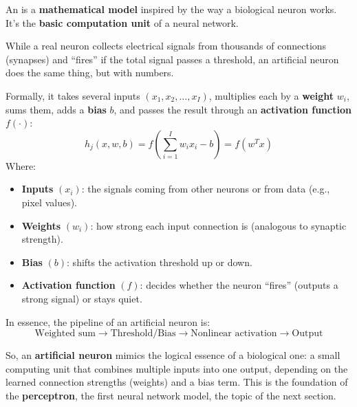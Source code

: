 \newpage

\begin{definitionbox}\label{def:artificial-neuron}
    An  is a \textbf{mathematical model} inspired by the way a biological neuron works. It's the \textbf{basic computation unit} of a neural network.

    \highspace
    While a real neuron collects electrical signals from thousands of connections (synapses) and ``fires'' if the total signal passes a threshold, an artificial neuron does the same thing, but with numbers.

    \highspace
    Formally, it takes several inputs $\left(x_1, x_2, \ldots, x_I\right)$, multiplies each by a \textbf{weight} $w_i$, sums them, adds a \textbf{bias} $b$, and passes the result through an \textbf{activation function} $f(\cdot)$:
    \begin{equation}
        h_{j}\left(x, w, b\right) = f\left(\sum_{i=1}^{I} w_{i} x_{i} - b\right) = f\left(w^{T} x\right)
    \end{equation}
    Where:
    \begin{itemize}
        \item \textbf{Inputs} $\left(x_i\right)$: the signals coming from other neurons or from data (e.g., pixel values).
        \item \textbf{Weights} $\left(w_i\right)$: how strong each input connection is (analogous to synaptic strength).
        \item \textbf{Bias} $\left(b\right)$: shifts the activation threshold up or down.
        \item \textbf{Activation function} $\left(f\right)$: decides whether the neuron ``fires'' (outputs a strong signal) or stays quiet.
    \end{itemize}
    In essence, the pipeline of an artificial neuron is:
    \begin{equation*}
        \text{Weighted sum} \rightarrow \text{Threshold/Bias} \rightarrow \text{Nonlinear activation} \rightarrow \text{Output}
    \end{equation*}
\end{definitionbox}

\highspace
So, an \textbf{artificial neuron} mimics the logical essence of a biological one: a small computing unit that combines multiple inputs into one output, depending on the learned connection strengths (weights) and a bias term. This is the foundation of the \textbf{perceptron}, the first neural network model, the topic of the next section.